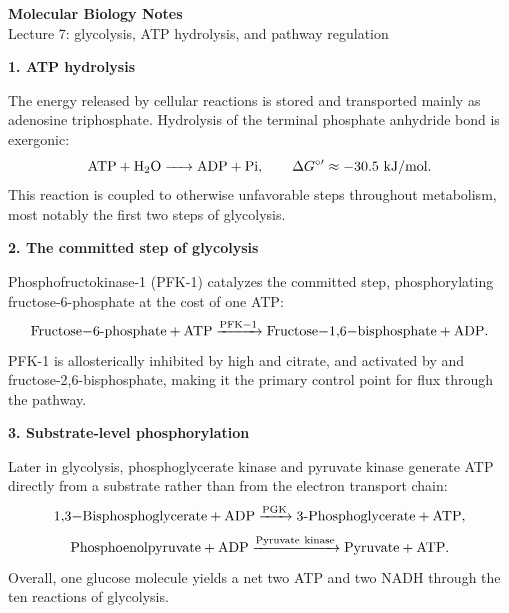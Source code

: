 \documentclass[10pt]{article}
\newcommand{\heading}[1]{{\bfseries\color{accent} #1}}
\begin{document}
{\LARGE\bfseries\color{accent} Molecular Biology Notes}\\[0.1em]
{\large Lecture 7: glycolysis, ATP hydrolysis, and pathway regulation}

\vspace{0.5em}
\heading{1. ATP hydrolysis}

The energy released by cellular reactions is stored and transported mainly as
adenosine triphosphate. Hydrolysis of the terminal phosphate anhydride bond is
exergonic:
\[
  \ce{ATP + H2O -> ADP + Pi}, \qquad \Delta G^{\circ\prime} \approx -30.5\ \text{kJ/mol}.
\]
This reaction is coupled to otherwise unfavorable steps throughout metabolism,
most notably the first two steps of glycolysis.

\heading{2. The committed step of glycolysis}

Phosphofructokinase-1 (PFK-1) catalyzes the committed step, phosphorylating
fructose-6-phosphate at the cost of one ATP:
\[
  \ce{Fructose-6-phosphate + ATP ->[PFK-1] Fructose-1,6-bisphosphate + ADP}.
\]
PFK-1 is allosterically inhibited by high  and citrate, and activated
by  and fructose-2,6-bisphosphate, making it the primary control point
for flux through the pathway.

\heading{3. Substrate-level phosphorylation}

Later in glycolysis, phosphoglycerate kinase and pyruvate kinase generate ATP
directly from a substrate rather than from the electron transport chain:
\[
  \ce{1,3-Bisphosphoglycerate + ADP ->[PGK] 3-Phosphoglycerate + ATP},
\]
\[
  \ce{Phosphoenolpyruvate + ADP ->[Pyruvate\ kinase] Pyruvate + ATP}.
\]
Overall, one glucose molecule yields a net two ATP and two NADH through the
ten reactions of glycolysis.
\end{document}
